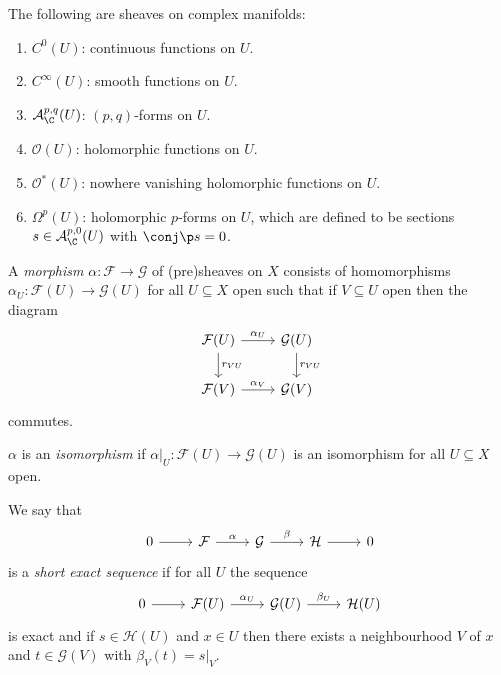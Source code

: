\documentclass[a4paper]{article}
\begin{document}
\begin{eg}
  The following are sheaves on complex manifolds:
  \begin{enumerate}
  \item \(C^0(U)\): continuous functions on \(U\).
  \item \(C^\infty(U)\): smooth functions on \(U\).
  \item \(\mathcal A_\C^{p, q}(U)\): \((p, q)\)-forms on \(U\).
  \item \(\mathcal O(U)\): holomorphic functions on \(U\).
  \item \(\mathcal O^*(U)\): nowhere vanishing holomorphic functions on \(U\).
  \item \(\Omega^p(U)\): holomorphic \(p\)-forms on \(U\), which are defined to be sections \(s \in \mathcal A_\C^{p, 0}(U)\) with \(\conj \p s = 0\).
  \end{enumerate}
\end{eg}

\begin{definition}
  A \emph{morphism} \(\alpha: \mathcal F \to \mathcal G\) of (pre)sheaves on \(X\) consists of homomorphisms \(\alpha_U: \mathcal F(U) \to \mathcal G(U)\) for all \(U \subseteq X\) open such that if \(V \subseteq U\) open then the diagram
  \[
    \begin{tikzcd}
      \mathcal F(U) \ar[r, "\alpha_U"] \ar[d, "r_{VU}"] & \mathcal G(U) \ar[d, "r_{VU}"] \\
      \mathcal F(V) \ar[r, "\alpha_V"] & \mathcal G(V)
    \end{tikzcd}
  \]
  commutes.

  \(\alpha\) is an \emph{isomorphism} if \(\alpha|_U: \mathcal F(U) \to \mathcal G(U)\) is an isomorphism for all \(U \subseteq X\) open.
\end{definition}

\begin{definition}
  We say that
  \[
    \begin{tikzcd}
      0 \ar[r] & \mathcal F \ar[r, "\alpha"] & \mathcal G \ar[r, "\beta"] & \mathcal H \ar[r] & 0
    \end{tikzcd}
  \]
  is a \emph{short exact sequence} if for all \(U\) the sequence
  \[
    \begin{tikzcd}
      0 \ar[r] & \mathcal F(U) \ar[r, "\alpha_U"] & \mathcal G(U) \ar[r, "\beta_U"] & \mathcal H(U)
    \end{tikzcd}
  \]
  is exact and if \(s \in \mathcal H(U)\) and \(x \in U\) then there exists a neighbourhood \(V\) of \(x\) and \(t \in \mathcal G(V)\) with \(\beta_V(t) = s|_V\).
\end{definition}
\end{document}
